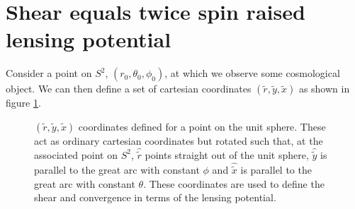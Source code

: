 \documentclass[11pt]{article} %
\begin{document}






\section{Shear equals twice spin raised lensing potential}\label{sec:shear}

Consider a point on $S^2$, $(r_0, \theta_0, \phi_0)$, at which we observe some cosmological object. We can then define a set of cartesian coordinates $(\tilde r, \tilde y, \tilde x)$ as shown in figure \ref{fig:tildecoords}.

\begin{figure}[h!]
    \centering
    
    \caption{
        $(\tilde r, \tilde y, \tilde x)$ coordinates defined for a point on the unit sphere. These act as ordinary cartesian coordinates but rotated such that, at the associated point on $S^2$, $\hat{\tilde r}$ points straight out of the unit sphere, $\hat{\tilde y}$ is parallel to the great arc with constant $\phi$ and $\hat{\tilde x}$ is parallel to the great arc with constant $\theta$. These coordinates are used to define the shear and convergence in terms of the lensing potential.
        }
    \label{fig:tildecoords}
\end{figure}
\end{document}
